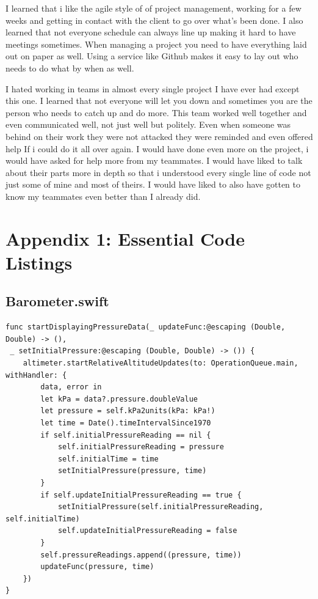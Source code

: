 \documentclass[onecolumn, draftclsnofoot,10pt, compsoc]{IEEEtran}
\begin{document}
    I learned that i like the agile style of of project management, working for a few weeks and getting in contact with the client to go over what's been done. I also learned that not everyone schedule can always line up making it hard to have meetings sometimes. When managing a project you need to have everything laid out on paper as well. Using a service like Github makes it easy to lay out who needs to do what by when as well.

    I hated working in teams in almost every single project I have ever had except this one. I learned that not everyone will let you down and sometimes you are the person who needs to catch up and do more. This team worked well together and even communicated well, not just well but politely. Even when someone was behind on their work they were not attacked they were reminded and even offered help
    If i could do it all over again. I would have done even more on the project, i would have asked for help more from my teammates. I would have liked to talk about their parts more in depth so that i understood every single line of code not just some of mine and most of theirs. I would have liked to also have gotten to know my teammates even better than I already did.

\section{Appendix 1: Essential Code Listings}
\subsection{Barometer.swift}
    \begin{lstlisting}
func startDisplayingPressureData(_ updateFunc:@escaping (Double, Double) -> (),
 _ setInitialPressure:@escaping (Double, Double) -> ()) {
    altimeter.startRelativeAltitudeUpdates(to: OperationQueue.main, withHandler: {
        data, error in
        let kPa = data?.pressure.doubleValue
        let pressure = self.kPa2units(kPa: kPa!)
        let time = Date().timeIntervalSince1970
        if self.initialPressureReading == nil {
            self.initialPressureReading = pressure
            self.initialTime = time
            setInitialPressure(pressure, time)
        }
        if self.updateInitialPressureReading == true {
            setInitialPressure(self.initialPressureReading, self.initialTime)
            self.updateInitialPressureReading = false
        }
        self.pressureReadings.append((pressure, time))
        updateFunc(pressure, time)
    })
}
    \end{lstlisting}
\end{document}
